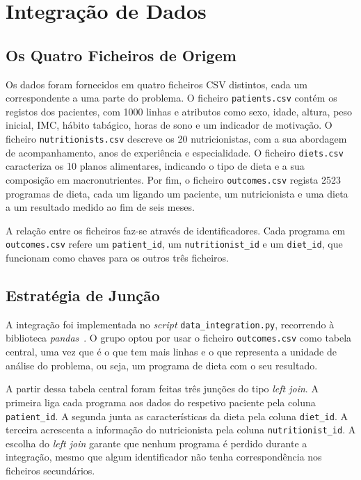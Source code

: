 \chapter{Integração de Dados}
\label{chap:integracao}

\section{Os Quatro Ficheiros de Origem}
Os dados foram fornecidos em quatro ficheiros \ac{CSV} distintos, cada um correspondente a uma parte do problema. O ficheiro \texttt{patients.csv} contém os registos dos pacientes, com 1000 linhas e atributos como sexo, idade, altura, peso inicial, \ac{IMC}, hábito tabágico, horas de sono e um indicador de motivação. O ficheiro \texttt{nutritionists.csv} descreve os 20 nutricionistas, com a sua abordagem de acompanhamento, anos de experiência e especialidade. O ficheiro \texttt{diets.csv} caracteriza os 10 planos alimentares, indicando o tipo de dieta e a sua composição em macronutrientes. Por fim, o ficheiro \texttt{outcomes.csv} regista 2523 programas de dieta, cada um ligando um paciente, um nutricionista e uma dieta a um resultado medido ao fim de seis meses.

A relação entre os ficheiros faz-se através de identificadores. Cada programa em \texttt{outcomes.csv} refere um \texttt{patient\_id}, um \texttt{nutritionist\_id} e um \texttt{diet\_id}, que funcionam como chaves para os outros três ficheiros.

\section{Estratégia de Junção}
A integração foi implementada no \textit{script} \texttt{data\_integration.py}, recorrendo à biblioteca \textit{pandas}~\cite{pandas}. O grupo optou por usar o ficheiro \texttt{outcomes.csv} como tabela central, uma vez que é o que tem mais linhas e o que representa a unidade de análise do problema, ou seja, um programa de dieta com o seu resultado.

A partir dessa tabela central foram feitas três junções do tipo \textit{left join}. A primeira liga cada programa aos dados do respetivo paciente pela coluna \texttt{patient\_id}. A segunda junta as características da dieta pela coluna \texttt{diet\_id}. A terceira acrescenta a informação do nutricionista pela coluna \texttt{nutritionist\_id}. A escolha do \textit{left join} garante que nenhum programa é perdido durante a integração, mesmo que algum identificador não tenha correspondência nos ficheiros secundários.

